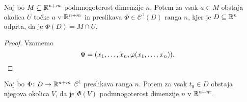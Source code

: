 \begin{trditev}
Naj bo $M \subseteq \mathbb{R}^{n+m}$ podmnogoterost dimenzije $n$. Potem
za vsak $a \in M$ obstaja okolica $U$ točke $a$ v $\mathbb{R}^{n+m}$ in
preslikava $\Phi \in \mathcal{C}^1(D)$ ranga $n$, kjer je
$D \subseteq \mathbb{R}^n$ odprta, da je $\Phi(D) = M \cap U$.
\end{trditev}

\begin{proof}
Vzamemo
\[
\Phi = (x_1, \dots, x_n, \varphi(x_1, \dots, x_n)). \qedhere
\]
\end{proof}

\begin{trditev}
Naj bo $\Phi \colon D \to \mathbb{R}^{n+m}$ $\mathcal{C}^1$ preslikava
ranga $n$. Potem za vsak $t_0 \in D$ obstaja njegova okolica $V$,
da je $\Phi(V)$ podmnogoterost dimenzije $n$ v $\mathbb{R}^{n+m}$.
\end{trditev}

%
%
